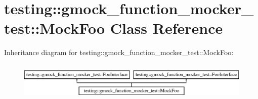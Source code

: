 \hypertarget{classtesting_1_1gmock__function__mocker__test_1_1_mock_foo}{}\section{testing\+::gmock\+\_\+function\+\_\+mocker\+\_\+test\+::Mock\+Foo Class Reference}
\label{classtesting_1_1gmock__function__mocker__test_1_1_mock_foo}
Inheritance diagram for testing\+::gmock\+\_\+function\+\_\+mocker\+\_\+test\+::Mock\+Foo\+:\begin{figure}[H]
\begin{center}
\leavevmode
\includegraphics[height=1.854305cm]{d6/d86/classtesting_1_1gmock__function__mocker__test_1_1_mock_foo}
\end{center}
\end{figure}

